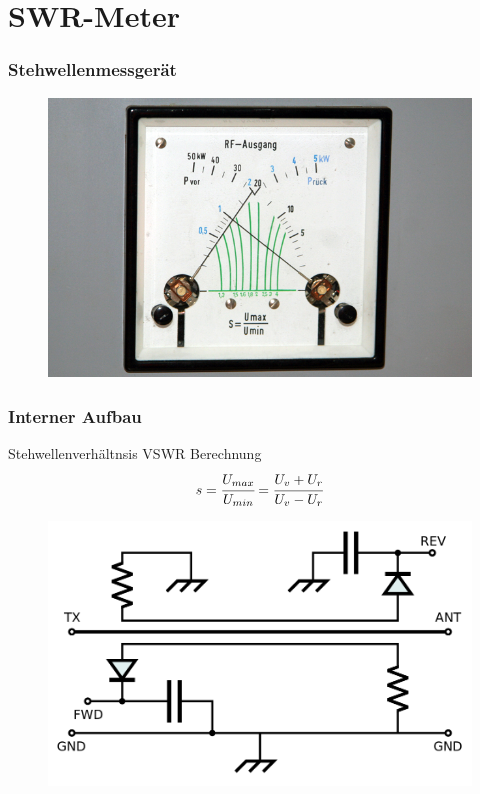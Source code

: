 \section*{SWR-Meter}

\begin{frame}
  \frametitle{Stehwellenmessgerät}
  \begin{center}
    \begin{figure}
      \includegraphics[width=1\textwidth,height=.75\textheight,keepaspectratio]{e17/RS_SWR.jpg}
    \end{figure}
  \end{center}
\end{frame}

\begin{frame}
  \frametitle{Interner Aufbau}
  \begin{block}{Stehwellenverhältnsis VSWR Berechnung}
    $$s = \cfrac{U_{max}}{U_{min}} = \cfrac{U_v + U_r}{U_v - U_r}$$
  \end{block}
  \begin{center}
    \begin{figure}
      \includegraphics[width=.8\textwidth,height=.5\textheight,keepaspectratio]{e17/SWRMeterInnen.png}
    \end{figure}
  \end{center}
\end{frame}

